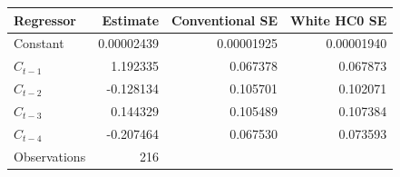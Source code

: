\begin{tabular}{lrrr}
\toprule
Regressor & Estimate & Conventional SE & White HC0 SE \\
\midrule
Constant & 0.00002439 & 0.00001925 & 0.00001940 \\
$C_{t-1}$ & 1.192335 & 0.067378 & 0.067873 \\
$C_{t-2}$ & -0.128134 & 0.105701 & 0.102071 \\
$C_{t-3}$ & 0.144329 & 0.105489 & 0.107384 \\
$C_{t-4}$ & -0.207464 & 0.067530 & 0.073593 \\
\midrule
Observations & 216 & & \\
\bottomrule
\end{tabular}
